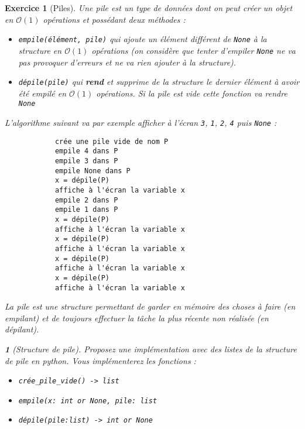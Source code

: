 \documentclass{article}
\theoremstyle{exostyle}
\newtheorem{exo}{Exercice}
\theoremstyle{partiestyle}
\newtheorem{partie}{}[exo]
\theoremstyle{questionstyle}
\begin{document}
\clearpage
\begin{exo}[Piles]
        Une pile est un type de données dont on peut créer un objet en $\mathcal{O}(1)$ opérations et possédant deux méthodes :
        \begin{itemize}
            \item \verb|empile(élément, pile)| qui ajoute un élément différent de \verb|None| à la structure en $\mathcal{O}(1)$ opérations (on considère que tenter d'empiler \verb|None| ne va pas provoquer d'erreurs et ne va rien ajouter à la structure).
            \item \verb|dépile(pile)| qui {\bf rend} et supprime de la structure le dernier élément à avoir été empilé en $\mathcal{O}(1)$ opérations. Si la pile est vide cette fonction va rendre \verb|None|
        \end{itemize}
        

        L'algorithme suivant va par exemple afficher à l'écran \verb|3|, \verb|1|, \verb|2|, \verb|4| puis \verb|None| :
        \begin{verbatim}
            crée une pile vide de nom P
            empile 4 dans P
            empile 3 dans P
            empile None dans P
            x = dépile(P)
            affiche à l'écran la variable x
            empile 2 dans P
            empile 1 dans P
            x = dépile(P)
            affiche à l'écran la variable x
            x = dépile(P)
            affiche à l'écran la variable x
            x = dépile(P)
            affiche à l'écran la variable x
            x = dépile(P)
            affiche à l'écran la variable x
        \end{verbatim}

        La pile est une structure permettant de garder en mémoire des choses à faire (en empilant) et de toujours effectuer la tâche la plus récente non réalisée (en dépilant).
        
    \begin{partie}[Structure de pile]

            Proposez une implémentation avec des listes de la structure de pile en python. Vous implémenterez les fonctions :
            \begin{itemize}
                \item \verb|crée_pile_vide() -> list|
                \item \verb|empile(x: int or None, pile: list|                
                \item \verb|dépile(pile:list) -> int or None|    
            \end{itemize}            
                

\end{partie}
\end{exo}
\end{document}
